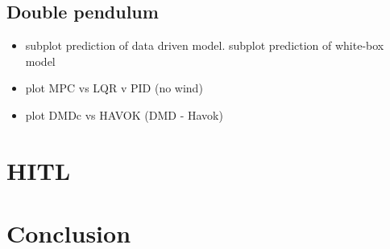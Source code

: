         \FloatBarrier\subsection{Double pendulum}

            \begin{itemize}
                \item subplot prediction of data driven model. subplot prediction of white-box model
                \item plot \gls{MPC} vs \gls{LQR} v \gls{PID} (no wind)
                \item plot \gls{DMDc} vs \gls{HAVOK} (\gls{DMD} - Havok)
            \end{itemize}

    \section{HITL}

    \section{Conclusion}


